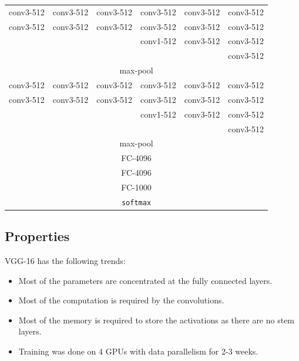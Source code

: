 \begin{table}[H]
\begin{tabular}{c|c|c|c|c|c}
        \midrule
        conv3-512 & conv3-512 & conv3-512 & conv3-512 & conv3-512 & conv3-512 \\
        conv3-512 & conv3-512 & conv3-512 & conv3-512 & conv3-512 & conv3-512 \\
                  &           &           & conv1-512 & conv3-512 & conv3-512 \\
                  &           &           &           &           & conv3-512 \\
        \midrule
        \multicolumn{6}{c}{max-pool} \\
        \midrule
        conv3-512 & conv3-512 & conv3-512 & conv3-512 & conv3-512 & conv3-512 \\
        conv3-512 & conv3-512 & conv3-512 & conv3-512 & conv3-512 & conv3-512 \\
                  &           &           & conv1-512 & conv3-512 & conv3-512 \\
                  &           &           &           &           & conv3-512 \\
        \midrule
        \multicolumn{6}{c}{max-pool} \\
        \midrule
        \multicolumn{6}{c}{FC-4096} \\
        \multicolumn{6}{c}{FC-4096} \\
        \multicolumn{6}{c}{FC-1000} \\
        \multicolumn{6}{c}{\texttt{softmax}} \\
        \bottomrule
    \end{tabular}
\end{table}


\subsection{Properties}

VGG-16 has the following trends:
\begin{itemize}
    \item Most of the parameters are concentrated at the fully connected layers.
    \item Most of the computation is required by the convolutions.
    \item Most of the memory is required to store the activations as there are no stem layers.
    \item Training was done on 4 GPUs with data parallelism for 2-3 weeks.
\end{itemize}

